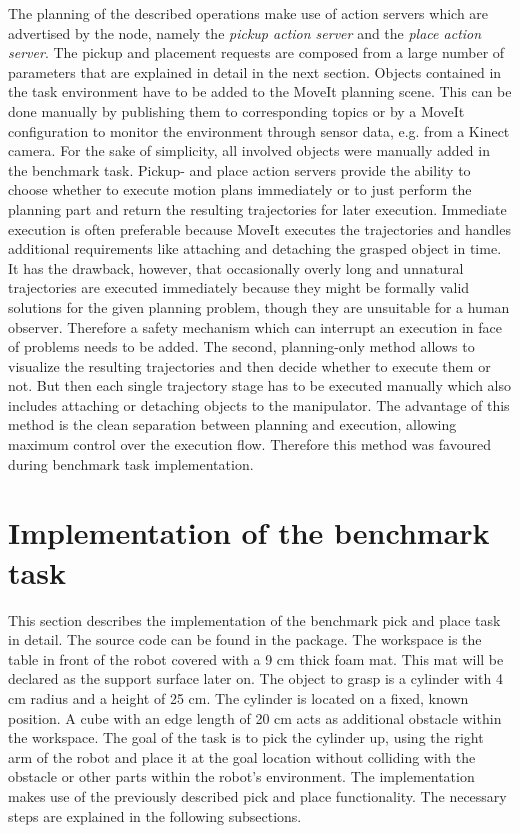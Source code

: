 The planning of the described operations make use of action servers which are advertised by the  node, namely the \emph{pickup action server} and the \emph{place action server}. The pickup and placement requests are composed from a large number of parameters that are explained in detail in the next section. Objects contained in the task environment have to be added to the MoveIt planning scene. This can be done manually by publishing them to corresponding topics or by a MoveIt configuration to monitor the environment through sensor data, e.g. from a Kinect camera. For the sake of simplicity, all involved objects were manually added in the benchmark task. Pickup- and place action servers provide the ability to choose whether to execute motion plans immediately or to just perform the planning part and return the resulting trajectories for later execution. Immediate execution is often preferable because MoveIt executes the trajectories and handles additional requirements like attaching and detaching the grasped object in time. It has the drawback, however, that occasionally overly long and unnatural trajectories are executed immediately because they might be formally valid solutions for the given planning problem, though they are unsuitable for a human observer. Therefore a safety mechanism which can interrupt an execution in face of problems needs to be added. The second, planning-only method allows to visualize the resulting trajectories and then decide whether to execute them or not. But then each single trajectory stage has to be executed manually which also includes attaching or detaching objects to the manipulator. The advantage of this method is the clean separation between planning and execution, allowing maximum control over the execution flow. Therefore this method was favoured during benchmark task implementation.

\section{Implementation of the benchmark task}

This section describes the implementation of the benchmark pick and place task in detail. The source code can be found in the  package. The workspace is the table in front of the robot covered with a 9 cm thick foam mat. This mat will be declared as the support surface later on. The object to grasp is a cylinder with 4 cm radius and a height of 25 cm. The cylinder is located on a fixed, known position. A cube with an edge length of 20 cm acts as additional obstacle within the workspace. The goal of the task is to pick the cylinder up, using the right arm of the robot and place it at the goal location without colliding with the obstacle or other parts within the robot's environment. The implementation makes use of the previously described pick and place functionality. The necessary steps are explained in the following subsections.

